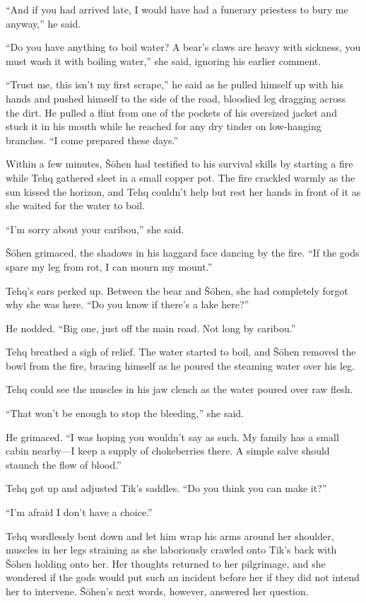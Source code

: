 ``And if you had arrived late, I would have had a funerary priestess to bury me anyway,'' he said.

``Do you have anything to boil water? A bear's claws are heavy with sickness, you must wash it with boiling water,'' she said, ignoring his earlier comment.

``Trust me, this isn't my first scrape,'' he said as he pulled himself up with his hands and pushed himself to the side of the road, bloodied leg dragging across the dirt. He pulled a flint from one of the pockets of his oversized jacket and stuck it in his mouth while he reached for any dry tinder on low-hanging branches. ``I come prepared these days.''

Within a few minutes, Šōhen had testified to his survival skills by starting a fire while Tehq gathered sleet in a small copper pot. The fire crackled warmly as the sun kissed the horizon, and Tehq couldn't help but rest her hands in front of it as she waited for the water to boil.

``I'm sorry about your caribou,'' she said.

Šōhen grimaced, the shadows in his haggard face dancing by the fire. ``If the gods spare my leg from rot, I can mourn my mount.''

Tehq's ears perked up. Between the bear and Šōhen, she had completely forgot why she was here. ``Do you know if there's a lake here?''

He nodded. ``Big one, just off the main road. Not long by caribou.''

Tehq breathed a sigh of relief. The water started to boil, and Šōhen removed the bowl from the fire, bracing himself as he poured the steaming water over his leg.

Tehq could see the muscles in his jaw clench as the water poured over raw flesh.

``That won't be enough to stop the bleeding,'' she said.

He grimaced. ``I was hoping you wouldn't say as such. My family has a small cabin nearby---I keep a supply of chokeberries there. A simple salve should staunch the flow of blood.''

Tehq got up and adjusted Tik's saddles. ``Do you think you can make it?''

``I'm afraid I don't have a choice.''

Tehq wordlessly bent down and let him wrap his arms around her shoulder, muscles in her legs straining as she laboriously crawled onto Tik's back with Šōhen holding onto her. Her thoughts returned to her pilgrimage, and she wondered if the gods would put such an incident before her if they did not intend her to intervene. Šōhen's next words, however, answered her question.

